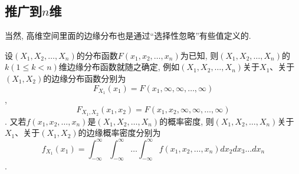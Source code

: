 \subsection{推广到$n$维}

当然, 高维空间里面的边缘分布也是通过``选择性忽略''有些值定义的. 

\begin{definition}
  设$(X_1,X_2,\dots,X_n)$的分布函数$F(x_1,x_2,\dots,x_n)$为已知, 则$(X_1,X_2,\dots,X_n)$的$k(1 \leq k < n )$维边缘分布函数就随之确定, 例如$(X_1,X_2,\dots,X_n)$关于$X_1$、关于$(X_1,X_2)$的边缘分布函数分别为
    \[F_{X_1}(x_1) = F(x_1,\infty,\infty,\dots,\infty)\],
    \[F_{X_1,X_2}(x_1,x_2) = F(x_1,x_2,\infty,\infty,\dots,\infty)\].
又若$f(x_1,x_2,\dots,x_n)$是$(X_1,X_2,\dots,X_n)$的概率密度, 则$(X_1,X_2,\dots,X_n)$关于$X_1$、关于$(X_1,X_2)$的边缘概率密度分别为
    \[f_{X_1}(x_1) = \int_{-\infty}^{\infty}\int_{-\infty}^{\infty}
    \dots \int_{-\infty}^{\infty}f(x_1,x_2,\dots,x_n)d{x_2}d{x_3}\dots d{x_n}\].
\end{definition}
